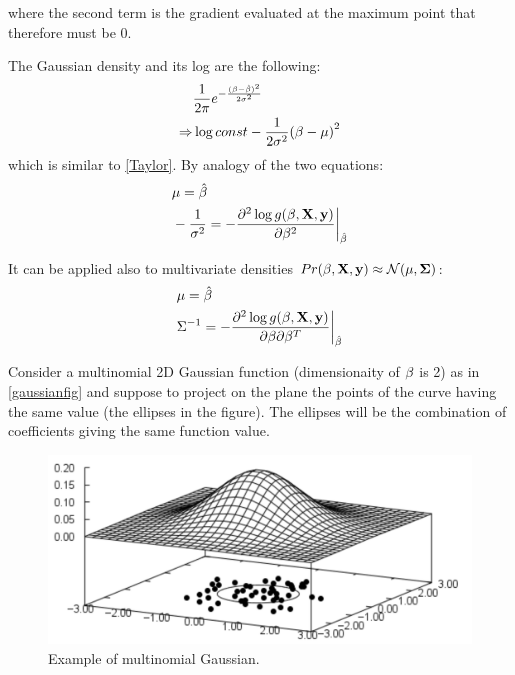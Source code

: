 where the second term is the gradient evaluated at the maximum point that therefore must be $0$.

The Gaussian density and its log are the following:
\begin{equation}
\begin{aligned}
&\frac{1}{2\pi}e^{-\frac{(\be-\hbe)^2}{2\sigma^2}}\\
\Rightarrow &\log const -\frac{1}{2\sigma^2}\br{\be-\mu}^2
\end{aligned}
\end{equation}
which is similar to \autoref{Taylor}. By analogy of the two equations:
\begin{equation}
\begin{aligned}
&\mathbf{\mu} = \hat{\mathbf{\beta}}\\
&-\frac{1}{\sigma^2} = -\frac{ \partial^2 \log g(\mathbf{\beta},\mathrm{\mathbf{X}},\mathbf{y})}{\partial \mathbf{\beta}^2}\bigg\rvert_{\hat{\mathbf{\beta}}}
\end{aligned}
\end{equation}

It can be applied also to multivariate densities  $Pr(\be,\X,\y) \approx \CMcal{N}(\mathbf{\mu, \Sigma})$:
\begin{equation}
\begin{aligned}
&\mathbf{\mu} = \hat{\mathbf{\beta}}\\
&\Sigma^{-1} = -\frac{ \partial^2 \log g(\mathbf{\beta},\mathrm{\mathbf{X}},\mathbf{y})}{\partial \mathbf{\beta}\partial\mathbf{\beta}^T}\bigg\rvert_{\hat{\mathbf{\beta}}}
\end{aligned}
\end{equation}

Consider a multinomial 2D Gaussian function (dimensionaity of $\mathbf{\beta}$ is 2) as in \autoref{gaussianfig} and suppose to project on the plane the points of the curve having the same value (the ellipses in the figure). The ellipses will be the combination of coefficients giving the same function value.
\begin{figure}
\centering
\includegraphics[scale=0.4]{img/gaussian}
\caption{Example of multinomial Gaussian.}
\label{gaussianfig}
\end{figure}

